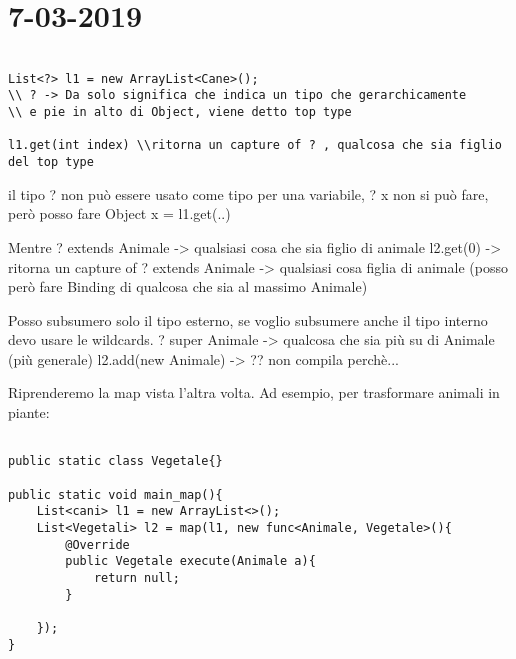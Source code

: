 

\newpage
\section{7-03-2019}
\par




\begin{lstlisting}[basicstyle=\small,]

List<?> l1 = new ArrayList<Cane>();
\\ ? -> Da solo significa che indica un tipo che gerarchicamente
\\ e pie in alto di Object, viene detto top type

l1.get(int index) \\ritorna un capture of ? , qualcosa che sia figlio del top type 

\end{lstlisting}

il tipo ? non può essere usato come tipo per una variabile, ? x non si può fare, però posso fare
 Object x = l1.get(..) \newline
 
Mentre ? extends Animale -> qualsiasi cosa che sia figlio di animale \newline
l2.get(0) -> ritorna un capture of ? extends Animale -> qualsiasi cosa figlia di animale (posso però fare Binding di qualcosa che sia al massimo Animale) \newline

Posso subsumero solo il tipo esterno, se voglio subsumere anche il tipo interno devo usare le wildcards. \newline
? super Animale -> qualcosa che sia più su di Animale (più generale) \newline
l2.add(new Animale) -> ?? non compila perchè... \newline

Riprenderemo la map vista l'altra volta. Ad esempio, per trasformare animali in piante: 



\begin{lstlisting}[basicstyle=\small,]

public static class Vegetale{}

public static void main_map(){
	List<cani> l1 = new ArrayList<>();
	List<Vegetali> l2 = map(l1, new func<Animale, Vegetale>(){
		@Override
		public Vegetale execute(Animale a){
			return null;
		}
	
	});
}

\end{lstlisting}


